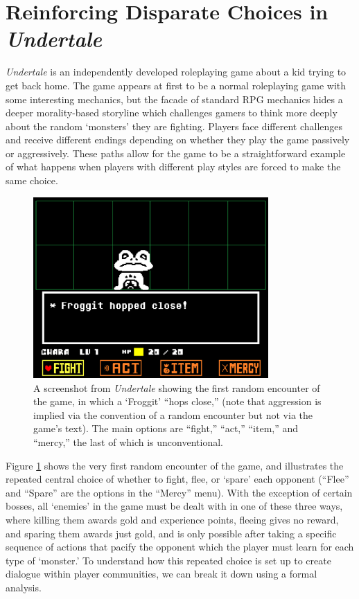 \documentclass[arts,article,submit,moreauthors,pdftex,10pt,a4paper]{Definitions/mdpi}
\begin{document}
\section{Reinforcing Disparate Choices in \emph{Undertale}}


\emph{Undertale} is an independently developed roleplaying game \citep{fox2015undertale} about a kid trying to get back home.
%
The game appears at first to be a normal roleplaying game with some interesting mechanics, but the facade of standard RPG mechanics hides a deeper morality-based storyline which challenges gamers to think more deeply about the random `monsters' they are fighting.
%
Players face different challenges and receive different endings depending on whether they play the game passively or aggressively.
%
These paths allow for the game to be a straightforward example of what happens when players with different play styles are forced to make the same choice.

\begin{figure}[t]
  \centering
    \includegraphics[width=0.8\textwidth]{fig/froggit.png}
    \caption{A screenshot from \emph{Undertale} showing the first random encounter of the game, in which a `Froggit' ``hops close,'' (note that aggression is implied via the convention of a random encounter but not via the game's text). The main options are ``fight,'' ``act,'' ``item,'' and ``mercy,'' the last of which is unconventional.}
    \label{fig:UT_froggit}
\end{figure}

Figure \ref{fig:UT_froggit} shows the very first random encounter of the game, and illustrates the repeated central choice of whether to fight, flee, or `spare' each opponent (``Flee'' and ``Spare'' are the options in the ``Mercy'' menu).
%
With the exception of certain bosses, all `enemies' in the game must be dealt with in one of these three ways, where killing them awards gold and experience points, fleeing gives no reward, and sparing them awards just gold, and is only possible after taking a specific sequence of actions that pacify the opponent which the player must learn for each type of `monster.'
%
To understand how this repeated choice is set up to create dialogue within player communities, we can break it down using a formal analysis.
\end{document}
